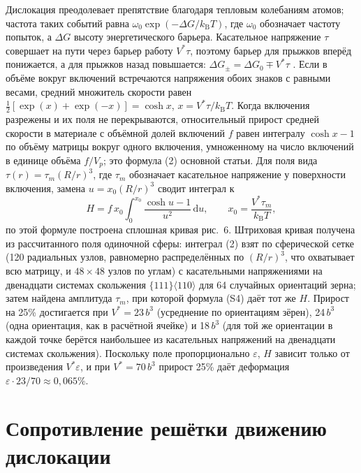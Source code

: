 \documentclass[11pt,a4paper]{article}
\begin{document}
Дислокация преодолевает препятствие благодаря тепловым колебаниям атомов;
частота таких событий равна $\omega_0\exp(-\Delta G/k_{\mathrm B}T)$, где
$\omega_0$ обозначает частоту попыток, а $\Delta G$ высоту энергетического
барьера. Касательное
напряжение $\tau$ совершает на пути через барьер работу $V^*\tau$, поэтому
барьер для прыжков вперёд понижается, а для прыжков назад повышается:
$\Delta G_\pm=\Delta G_0\mp V^*\tau$ \cite{KocksArgonAshby1975,CaillardMartin2003}.
Если в объёме вокруг включений встречаются напряжения обоих знаков
с равными весами, средний множитель скорости равен
$\tfrac12[\exp(x)+\exp(-x)]=\cosh x$, $x=V^*\tau/k_{\mathrm B}T$.
Когда включения разрежены и их поля не перекрываются, относительный
прирост средней скорости в материале с объёмной долей включений $f$ равен
интегралу $\cosh x-1$ по объёму матрицы вокруг одного включения,
умноженному на число включений в единице объёма $f/V_p$; это формула (2) основной статьи. Для поля вида $\tau(r)=\tau_m(R/r)^3$, где $\tau_m$ обозначает касательное
напряжение у поверхности включения, замена
$u=x_0(R/r)^3$ сводит интеграл к
\begin{equation}
H=f\,x_0\int_0^{x_0}\frac{\cosh u-1}{u^2}\,\mathrm du,\qquad
x_0=\frac{V^*\tau_m}{k_{\mathrm B}T},
\end{equation}
по этой формуле построена сплошная кривая рис.~6. Штриховая кривая
получена из рассчитанного поля одиночной сферы: интеграл (2) взят
по сферической сетке (120 радиальных узлов, равномерно распределённых по $(R/r)^3$, что
охватывает всю матрицу, и $48\times48$ узлов по углам) с касательными напряжениями на двенадцати системах скольжения
$\{111\}\langle110\rangle$ для 64 случайных ориентаций зерна; затем
найдена амплитуда $\tau_m$, при которой формула (S4) даёт тот же $H$.
Прирост на 25\% достигается при $V^*=23\,b^3$ (усреднение
по ориентациям зёрен), 24$\,b^3$ (одна ориентация, как
в расчётной ячейке) и 18$\,b^3$ (для той же ориентации в каждой
точке берётся наибольшее из касательных напряжений на двенадцати системах
скольжения).
Поскольку поле пропорционально $\varepsilon$, $H$ зависит только
от произведения $V^*\varepsilon$, и при $V^*=70\,b^3$ прирост 25\%
даёт деформация $\varepsilon\cdot23/70\approx0{,}065\%$.

\section{Сопротивление решётки движению дислокации}
\end{document}
